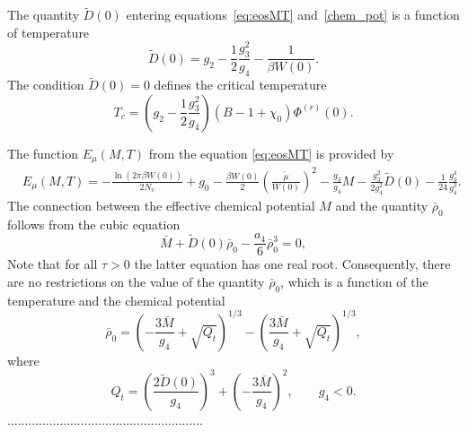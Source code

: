 \documentclass[12pt]{article}
\begin{document}
	The quantity $\tilde D(0)$ entering equations~\eqref{eq:eosMT} and~\eqref{chem_pot} is a function of temperature
	\begin{equation}
	\tilde D(0) = g_2 - \frac{1}{2} \frac{g_3^2}{g_4} - \frac{1}{\beta W(0)}.
	\end{equation}
	The condition $\tilde{D}(0) = 0$ defines the critical temperature~\cite{KozlovskiiDobush2020}
	\begin{equation}
		T_c = \left(g_2 - \frac{1}{2} \frac{g_3^2}{g_4} \right) (B - 1 + \chi_0) \Phi^{(r)}(0).
	\end{equation}    
	
	The function $E_\mu(M, T)$ from the equation \eqref{eq:eosMT} is provided by
	\begin{align}
		& E_\mu (M, T) = - \frac{\ln (2\pi \beta W(0))}{2 N_v}  +  g_0 - \frac{\beta W(0)}{2} \!\! \left( \! \frac{\tilde\mu}{W(0)} \! \right)^{\! 2} \!\!\! - \frac{g_3}{g_4} {M} \! - \frac{g_3^2}{2 g_4^2}  \tilde D(0) - \frac{1}{24} \frac{g_3^4}{g_4^3}. 
	\end{align}
	The connection between the effective chemical potential $M$ and the quantity $ \bar \rho_0 $ follows from the cubic equation
	\begin{equation}\label{eq:ro_M}
	\bar M + \tilde D(0) \bar\rho_0 - \frac{a_4}{6} \bar\rho_0^3 = 0,
	\end{equation}
	Note that for all $ \tau> 0 $ the latter equation has one real root. Consequently, there are no restrictions on the value of the quantity $ \bar \rho_0 $, which is a function of the temperature and the chemical potential
	\begin{equation}\label{eq:ro_MT}
	\bar \rho_0 = \left(- \frac{3\bar{M}}{g_4} + \sqrt{Q_t}\right)^{1/3} - \left(  \frac{3\bar{M}}{g_4} + \sqrt{Q_t} \right)^{1/3} \!\!\!\! ,
	\end{equation}
	where
	\begin{equation}
	Q_t = \left(  \frac{2\tilde D(0)}{g_4}\right)^3 + \left( -\frac{3\bar{M}}{g_4}\right)^2, \qquad g_4<0.
	\end{equation}  
	........................................................
	
\end{document}
